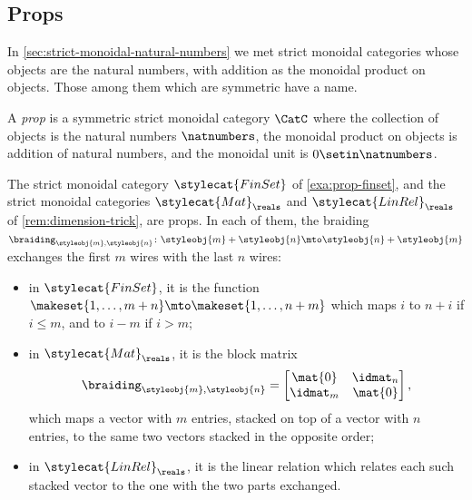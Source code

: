\subsection{Props}
\label{sec:props}

In \cref{sec:strict-monoidal-natural-numbers} we met strict monoidal categories whose objects are the natural numbers, with addition as the monoidal product on objects.
Those among them which are symmetric have a name.

\begin{ctdefinition}[Prop]\label{def:prop}
    A \emph{prop} is a symmetric strict monoidal category $\CatC$ where the collection of objects is the natural numbers $\natnumbers$, the monoidal product on objects is addition of natural numbers, and the monoidal unit is $0 \setin \natnumbers$.
\end{ctdefinition}

\begin{example}
    \label{exa:props}
    The strict monoidal category $\stylecat{FinSet}$ of \cref{exa:prop-finset}, and the strict monoidal categories $\stylecat{Mat}_\reals$ and $\stylecat{LinRel}_\reals$ of \cref{rem:dimension-trick}, are props.
    In each of them, the braiding $\braiding_{\styleobj{m},\styleobj{n}} \colon \styleobj{m} + \styleobj{n} \mto \styleobj{n} + \styleobj{m}$ exchanges the first $m$ wires with the last $n$ wires:
    \begin{itemize}
        \item in $\stylecat{FinSet}$, it is the function $\makeset{1, \dots, m + n} \mto \makeset{1, \dots, n + m}$ which maps $i$ to $n + i$ if $i \leq m$, and to $i - m$ if $i > m$;
        \item in $\stylecat{Mat}_\reals$, it is the block matrix
              \begin{equation}
                  \braiding_{\styleobj{m},\styleobj{n}} =
                  \begin{bmatrix}
                      \mat{0}  & \idmat_n \\
                      \idmat_m & \mat{0}
                  \end{bmatrix},
              \end{equation}
              which maps a vector with $m$ entries, stacked on top of a vector with $n$ entries, to the same two vectors stacked in the opposite order;
        \item in $\stylecat{LinRel}_\reals$, it is the linear relation which relates each such stacked vector to the one with the two parts exchanged.
    \end{itemize}
\end{example}


